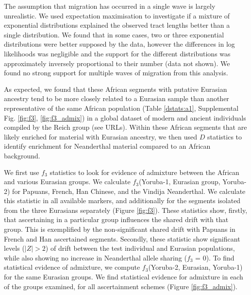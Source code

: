 The assumption that migration has occurred in a single wave is largely unrealistic. We used expectation maximisation to investigate if a mixture of exponential distributions explained the observed tract lengths better than a single distribution. We found that in some cases, two or three exponential distributions were better supposed by the data, however the differences in log likelihoods was negligible and the support for the different distributions was approximately inversely proportional to their number (data not shown). We found no strong support for multiple waves of migration from this analysis.


As expected, we found that these African segments with putative Eurasian ancestry tend to be more closely related to a Eurasian sample than another representative of the same African population (Table \autoref{dstats:a1}, Supplemental Fig. \autoref{fig:f3}, \autoref{fig:f3_admix}) in a global dataset of modern and ancient individuals compiled by the Reich group (see URLs). Within these African segments that are likely enriched for material with Eurasian ancestry, we then used $D$ statistics \cite{Patterson2012} to identify enrichment for Neanderthal material compared to an African background. 

We first use $f_3$ statistics to look for evidence of admixture between the African and various Eurasian groups. We calculate $f_3$(Yoruba-1, Eurasian group, Yoruba-2) for Papuans, French, Han Chinese, and the Vindija Neanderthal. We calculate this statistic in all available markers, and additionally for the segments isolated from the three Eurasians separately (Figure \ref{fig:f3}). These statistics show, firstly, that ascertaining in a particular group influences the shared drift with that group. This is exemplified by the non-significant shared drift with Papuans in French and Han ascertained segments. Secondly, these statistic show significant levels ($|Z|>2$) of drift between the test individual and Eurasian populations, while also showing no increase in Neanderthal allele sharing ($f_3$ = 0). To find statistical evidence of admixture, we compute $f_3$(Yoruba-2, Eurasian, Yoruba-1) for the same Eurasian groups. We find statistical evidence for admixture in each of the groups examined, for all ascertainment schemes (Figure \ref{fig:f3_admix}). 


